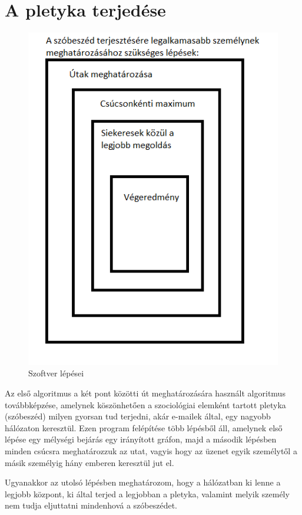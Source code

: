 \section{A pletyka terjedése}
\begin{figure}[!h]
	\centering
	\includegraphics[scale=0.45]{images/elsoprogram}
	\caption{Szoftver lépései}
\end{figure}
Az első algoritmus a két pont közötti út meghatározására használt algoritmus továbbképzése, amelynek köszönhetően a szociológiai elemként tartott pletyka (szóbeszéd) milyen gyorsan tud terjedni, akár e-mailek által, egy nagyobb hálózaton keresztül.
Ezen program felépítése több lépésből áll, amelynek első lépése egy mélységi bejárás egy irányított gráfon, majd a második lépésben minden csúcsra meghatározzuk az utat, vagyis hogy az üzenet egyik személytől a másik személyig hány emberen keresztül jut el.

Ugyanakkor az utolsó lépésben meghatározom, hogy a hálózatban ki lenne a legjobb központ, ki által terjed a legjobban a pletyka, valamint melyik személy nem tudja eljuttatni mindenhová a szóbeszédet.


